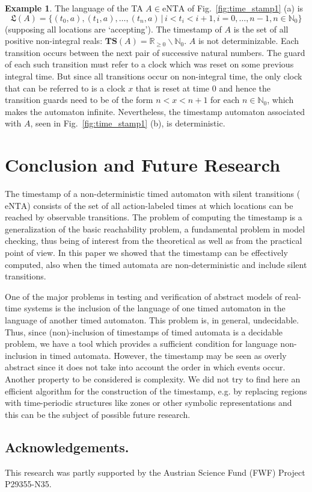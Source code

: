 \documentclass[11pt]{amsart}
\theoremstyle{definition}
\newtheorem{example}[theorem]{Example}
\newcommand{\LLL}{\mathfrak{L}}
\newcommand{\TTTSSS}{\mathbf{TS}}
\newcommand{\ntaeps}{\mathrm{eNTA}}
\newcommand{\ZNaturals}{\mathbb{N}_0}
\newcommand{\PReals}{\mathbb{R}_{\geq 0}}
\begin{document}
\begin{example}
The language of the TA $A \in \ntaeps$ of Fig.~\ref{fig:time_stamp1} (a) is
$$\LLL(A) = \{ (t_0, a), (t_1, a),\ldots, (t_n, a)\, | \, i < t_i < i+1, i=0,\ldots,n-1, n \in \ZNaturals \}$$ (supposing all locations are `accepting').
The timestamp of $A$ is the set of all positive non-integral reals: $\TTTSSS(A) = \PReals \smallsetminus \ZNaturals$.
$A$ is not determinizable. Each transition occurs between the next pair of successive natural numbers.
The guard of each such transition must refer to a clock which was reset on some previous integral time.
But since all transitions occur on non-integral time, the only clock that can be referred to is a clock $x$ that is reset at time $0$ and hence the transition guards need to be of the form $n < x < n+1$ for each $n \in \ZNaturals$, which makes the automaton infinite.
Nevertheless, the timestamp automaton associated with $A$, seen in Fig.~\ref{fig:time_stamp1} (b), is deterministic.
\end{example}
\section{Conclusion and Future Research}
The timestamp of a non-deterministic timed automaton with silent transitions ($\ntaeps$) consists of the set of all action-labeled times at which locations can be reached by observable transitions.
The problem of computing the timestamp is a generalization of the basic reachability problem, a fundamental problem in model checking, thus being of interest from the theoretical as well as from the practical point of view.
In this paper we showed that the timestamp can be effectively computed, also when the timed automata are non-deterministic and include silent transitions.

One of the major problems in testing and verification of abstract models of real-time systems is the inclusion of the language of one timed automaton in the language of another timed automaton.
This problem is, in general, undecidable.
Thus, since (non)-inclusion of timestamps of timed automata is a decidable problem, we have a tool which provides a sufficient condition for language non-inclusion in timed automata. However, the timestamp may be seen as overly abstract since it does not take into account the order in which events occur.
Another property to be considered is complexity.
We did not try to find here an efficient algorithm for the construction of the timestamp, e.g. by replacing regions with time-periodic structures like zones or other symbolic representations \cite{MPS11}
and this can be the subject of possible future research.

\subsection*{Acknowledgements.} 
\begin{small}
	This research was partly supported by the Austrian Science Fund (FWF) Project P29355-N35. \end{small}


\end{document}
